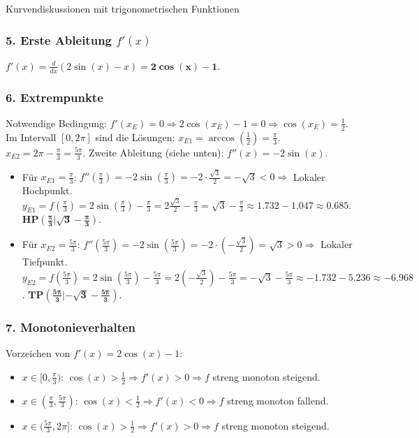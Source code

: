 \begin{loesungsumgebung}{Kurvendiskussionen mit trigonometrischen Funktionen}
\begin{enumerate}[label=(\alph*)]
    \subsubsection*{5. Erste Ableitung $f'(x)$}
    $f'(x) = \frac{d}{dx}(2\sin(x) - x) = \mathbf{2\cos(x) - 1}$.

    \subsubsection*{6. Extrempunkte}
    Notwendige Bedingung: $f'(x_E)=0 \Rightarrow 2\cos(x_E) - 1 = 0 \Rightarrow \cos(x_E) = \frac{1}{2}$.
    Im Intervall $[0, 2\pi]$ sind die Lösungen:
    $x_{E1} = \arccos(\frac{1}{2}) = \frac{\pi}{3}$.
    $x_{E2} = 2\pi - \frac{\pi}{3} = \frac{5\pi}{3}$.
    Zweite Ableitung (siehe unten): $f''(x) = -2\sin(x)$.
    \begin{itemize}
        \item Für $x_{E1} = \frac{\pi}{3}$: $f''(\frac{\pi}{3}) = -2\sin(\frac{\pi}{3}) = -2 \cdot \frac{\sqrt{3}}{2} = -\sqrt{3} < 0 \Rightarrow$ Lokaler Hochpunkt.
        $y_{E1} = f(\frac{\pi}{3}) = 2\sin(\frac{\pi}{3}) - \frac{\pi}{3} = 2\frac{\sqrt{3}}{2} - \frac{\pi}{3} = \sqrt{3} - \frac{\pi}{3} \approx 1.732 - 1.047 \approx 0.685$.
        $\mathbf{HP(\frac{\pi}{3}|\sqrt{3}-\frac{\pi}{3})}$.
        \item Für $x_{E2} = \frac{5\pi}{3}$: $f''(\frac{5\pi}{3}) = -2\sin(\frac{5\pi}{3}) = -2 \cdot (-\frac{\sqrt{3}}{2}) = \sqrt{3} > 0 \Rightarrow$ Lokaler Tiefpunkt.
        $y_{E2} = f(\frac{5\pi}{3}) = 2\sin(\frac{5\pi}{3}) - \frac{5\pi}{3} = 2(-\frac{\sqrt{3}}{2}) - \frac{5\pi}{3} = -\sqrt{3} - \frac{5\pi}{3} \approx -1.732 - 5.236 \approx -6.968$.
        $\mathbf{TP(\frac{5\pi}{3}|-\sqrt{3}-\frac{5\pi}{3})}$.
    \end{itemize}

    \subsubsection*{7. Monotonieverhalten}
    Vorzeichen von $f'(x) = 2\cos(x) - 1$:
    \begin{itemize}
        \item $x \in [0, \frac{\pi}{3})$: $\cos(x) > \frac{1}{2} \Rightarrow f'(x)>0 \Rightarrow f$ streng monoton steigend.
        \item $x \in (\frac{\pi}{3}, \frac{5\pi}{3})$: $\cos(x) < \frac{1}{2} \Rightarrow f'(x)<0 \Rightarrow f$ streng monoton fallend.
        \item $x \in (\frac{5\pi}{3}, 2\pi]$: $\cos(x) > \frac{1}{2} \Rightarrow f'(x)>0 \Rightarrow f$ streng monoton steigend.
    \end{itemize}


\end{enumerate}
\end{loesungsumgebung}
